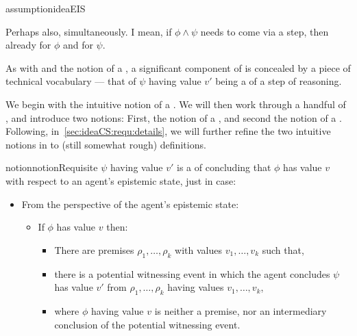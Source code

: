 \begin{note}
\begin{restatable}{assumption}{ideaEIS}
\begin{enumerate}
\begin{enumerate}[label=\alph*., ref=(\alph*)]
        Perhaps also, simultaneously.
        I mean, if \(\phi \land \psi\) needs to come via a step, then already for \(\phi\) and for \(\psi\).
      \end{enumerate}
    \end{enumerate}
    \vspace{-\baselineskip}
  \end{restatable}
\end{note}

\begin{note}
  As with \ideaS{} and the notion of a \emph{\sink{}}, a significant component of \ideaCS{} is concealed by a piece of technical vocabulary --- that of \(\psi\) having value \(v'\) being a \emph{\requ{}} of a step of reasoning.

  We begin with the intuitive notion of a \requ{}.
  We will then work through a handful of , and introduce two notions:
  First, the notion of a \crequ{}, and second the notion of a \prequ{}.
  Following, in~\autoref{sec:ideaCS:requ:details}, we will further refine the two intuitive notions in to (still somewhat rough) definitions.

  \begin{restatable}{notion}{notionRequisite}
    \label{notion:requ}
    \(\psi\) having value \(v'\) is a \requ{} of concluding that \(\phi\) has value \(v\) with respect to an agent's epistemic state, just in case:

    \begin{itemize}
    \item From the perspective of the agent's epistemic state:
    \begin{itemize}
    \item If \(\phi\) has value \(v\) then:
      \begin{itemize}
      \item There are premises \(\rho_{1},\dots,\rho_{k}\) with values \(v_{1},\dots,v_{k}\) such that,
      \item there is a potential witnessing event in which the agent concludes \(\psi\) has value \(v'\) from \(\rho_{1},\dots,\rho_{k}\) having values \(v_{1},\dots,v_{k}\),
      \item where \(\phi\) having value \(v\) is neither a premise, nor an intermediary conclusion of the potential witnessing event.
      \end{itemize}
    \end{itemize}
  \end{itemize}
  \vspace{-\baselineskip}
  \end{restatable}


\end{note}
